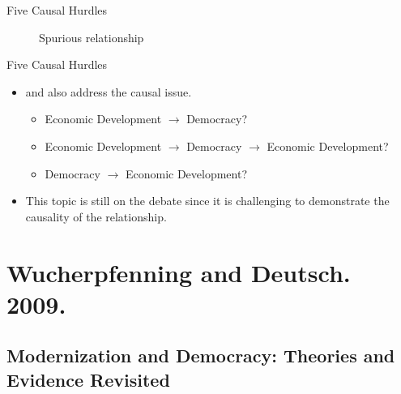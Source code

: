 \documentclass[xcolor=dvipsnames]{beamer}
\begin{document}
	\begin{frame}[fragile]{Five Causal Hurdles}
	\begin{figure}
  \centering
  \caption{Spurious relationship}
  \label{fig1}
  \end{figure}
	\end{frame}
	
	\begin{frame}[fragile]{Five Causal Hurdles}
	\begin{itemize}
	  \item \citet{wucherpfennig:Deutsch:2009} and \citet{boix:stokes:2003} also address the causal issue.
	  \begin{itemize}
	    \item Economic Development $\rightarrow$ Democracy? \pause
	    \item Economic Development $\rightarrow$ Democracy $\rightarrow$ Economic Development?
  	  \item Democracy $\rightarrow$ Economic Development?
  	 \end{itemize}
  	\item This topic is still on the debate since it is challenging to demonstrate the causality of the relationship.
	\end{itemize}
	\end{frame}
	
	\section{Wucherpfenning and Deutsch. 2009.}
	\subsection{Modernization and Democracy: Theories and Evidence Revisited}
	
\end{document}
